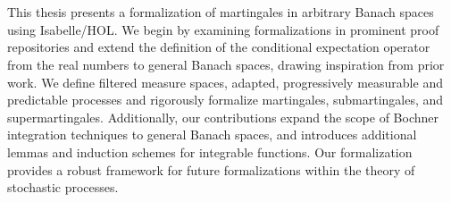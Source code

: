 ﻿\chapter{\abstractname}

This thesis presents a formalization of martingales in arbitrary Banach spaces using Isabelle/HOL. We begin by examining formalizations in prominent proof repositories and extend the definition of the conditional expectation operator from the real numbers to general Banach spaces, drawing inspiration from prior work. We define filtered measure spaces, adapted, progressively measurable and predictable processes and rigorously formalize martingales, submartingales, and supermartingales. Additionally, our contributions expand the scope of Bochner integration techniques to general Banach spaces, and introduces additional lemmas and induction schemes for integrable functions. Our formalization provides a robust framework for future formalizations within the theory of stochastic processes.